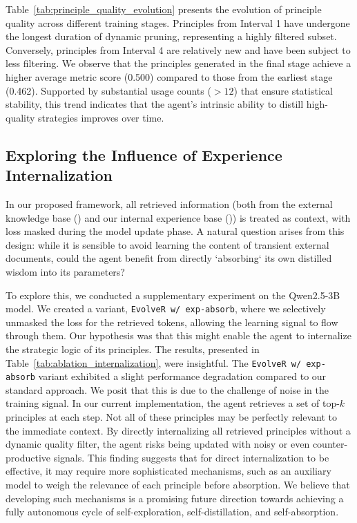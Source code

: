 Table~\ref{tab:principle_quality_evolution} presents the evolution of principle quality across different training stages. Principles from Interval 1 have undergone the longest duration of dynamic pruning, representing a highly filtered subset. Conversely, principles from Interval 4 are relatively new and have been subject to less filtering. We observe that the principles generated in the final stage achieve a higher average metric score (0.500) compared to those from the earliest stage (0.462). Supported by substantial usage counts ($>12$) that ensure statistical stability, this trend indicates that the agent's intrinsic ability to distill high-quality strategies improves over time.

\subsection{Exploring the Influence of Experience Internalization}

In our proposed framework, all retrieved information (both from the external knowledge base () and our internal experience base ()) is treated as context, with loss masked during the model update phase. A natural question arises from this design: while it is sensible to avoid learning the content of transient external documents, could the agent benefit from directly `absorbing` its own distilled wisdom into its parameters?

To explore this, we conducted a supplementary experiment on the Qwen2.5-3B model. We created a variant, \texttt{EvolveR w/ exp-absorb}, where we selectively unmasked the loss for the retrieved  tokens, allowing the learning signal to flow through them. Our hypothesis was that this might enable the agent to internalize the strategic logic of its principles. The results, presented in Table~\ref{tab:ablation_internalization}, were insightful. The \texttt{EvolveR w/ exp-absorb} variant exhibited a slight performance degradation compared to our standard approach. We posit that this is due to the challenge of noise in the training signal. In our current implementation, the agent retrieves a set of top-$k$ principles at each step. Not all of these principles may be perfectly relevant to the immediate context. By directly internalizing all retrieved principles without a dynamic quality filter, the agent risks being updated with noisy or even counter-productive signals. This finding suggests that for direct internalization to be effective, it may require more sophisticated mechanisms, such as an auxiliary model to weigh the relevance of each principle before absorption. We believe that developing such mechanisms is a promising future direction towards achieving a fully autonomous cycle of self-exploration, self-distillation, and self-absorption.

